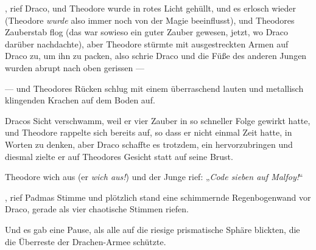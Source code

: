 , rief Draco, und Theodore wurde in rotes Licht gehüllt,  und es erlosch wieder (Theodore \emph{wurde} also immer noch von der Magie beeinflusst),  und Theodores Zauberstab flog (das war sowieso ein guter Zauber gewesen, jetzt, wo Draco darüber nachdachte), aber Theodore stürmte mit ausgestreckten Armen auf Draco zu, um ihn zu packen, also schrie Draco  und die Füße des anderen Jungen wurden abrupt nach oben gerissen —

— und Theodores Rücken schlug mit einem überraschend lauten und metallisch klingenden Krachen auf dem Boden auf.

Dracos Sicht verschwamm, weil er vier Zauber in so schneller Folge gewirkt hatte, und Theodore rappelte sich bereits auf, so dass er nicht einmal Zeit hatte, in Worten zu denken, aber Draco schaffte es trotzdem, ein  hervorzubringen und diesmal zielte er auf Theodores Gesicht statt auf seine Brust.

Theodore wich aus (er \emph{wich aus!}) und der Junge rief:
„\emph{Code sieben auf Malfoy!}“

, rief Padmas Stimme und plötzlich stand eine schimmernde Regenbogenwand vor Draco, gerade als vier chaotische Stimmen  riefen.

Und es gab eine Pause, als alle auf die riesige prismatische Sphäre blickten, die die Überreste der Drachen-Armee schützte.

